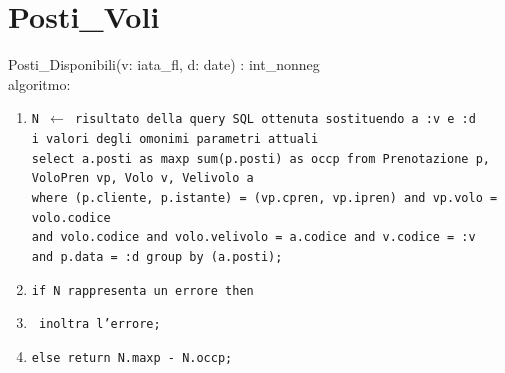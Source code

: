 \documentclass[a4paper,12pt]{report}
\begin{document}
      \section{Posti\_Voli}
        Posti\_Disponibili(v: iata\_fl, d: date) : int\_nonneg \\
        \hspace*{1cm}algoritmo:
        \begin{enumerate}[label*=\arabic*]
          \item \texttt{N $\leftarrow$ risultato della query SQL ottenuta sostituendo a :v e :d \\
            \hspace*{1cm} i valori degli omonimi parametri attuali \\
            \hspace*{1cm} select a.posti as maxp sum(p.posti) as occp from Prenotazione p, \\
            \hspace*{1cm} VoloPren vp, Volo v, Velivolo a \\
            \hspace*{1cm} where (p.cliente, p.istante) = (vp.cpren, vp.ipren) and vp.volo = volo.codice \\
            \hspace*{1cm} and volo.codice and volo.velivolo = a.codice and v.codice = :v \\
            \hspace*{1cm} and p.data = :d group by (a.posti);}
          \item \texttt{if N rappresenta un errore then}
          \item \texttt{\hspace*{1cm} inoltra l'errore;}
          \item \texttt{else return N.maxp - N.occp;}
        \end{enumerate}
\end{document}
